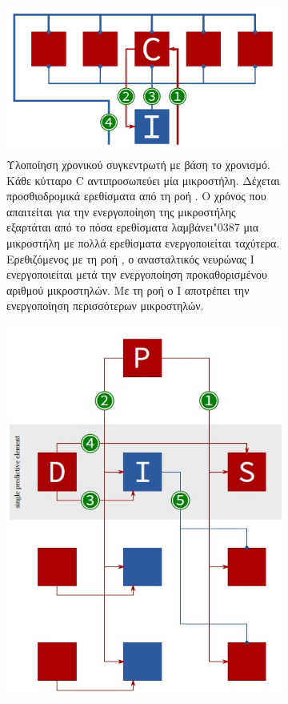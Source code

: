 	\begin{figure}[t]
		\centering
		\begin{subfigure}[t]{0.48\textwidth}
			\centering
			\includegraphics[width=.9\textwidth]{figures/spatial_hardware}
			\caption[κυκλωματική υλοποίηση χωρικού συγκεντρωτή]{Υλοποίηση χρονικού συγκεντρωτή με βάση το χρονισμό.
			Κάθε κύτταρο C αντιπροσωπεύει μία μικροστήλη. Δέχεται προσθιοδρομικά ερεθίσματα από τη ροή .
			Ο χρόνος που απαιτείται για την ενεργοποίηση της μικροστήλης εξαρτάται από το πόσα ερεθίσματα λαμβάνει\char"0387 μια μικροστήλη με πολλά ερεθίσματα ενεργοποιείται ταχύτερα.
			Ερεθιζόμενος με τη ροή , ο ανασταλτικός νευρώνας I ενεργοποιείται μετά την ενεργοποίηση προκαθορισμένου αριθμού μικροστηλών.
			Με τη ροή  ο I αποτρέπει την ενεργοποίηση περισσότερων μικροστηλών.
			}
			\label{fig:SP_circ}
		\end{subfigure}
		\hfill
		\begin{subfigure}[t]{0.49\textwidth}
			\centering
			\includegraphics[width=.7\textwidth]{figures/temporal_hardware}

\end{subfigure}
\end{figure}

